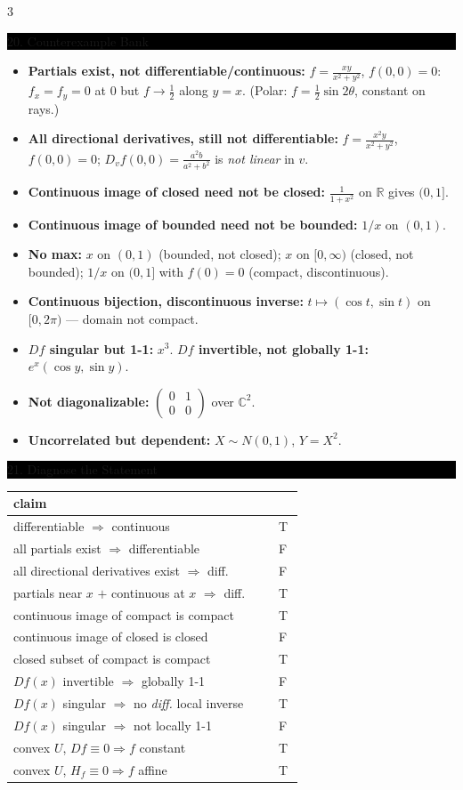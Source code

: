 \documentclass[8pt,letterpaper]{article}
\makeatletter
\newcommand{\sect}[1]{%
  \vspace{2.2pt}%
  \noindent\colorbox{black}{\parbox{\dimexpr\linewidth-2\fboxsep}{%
    \color{white}\bfseries\scshape\fontsize{6.4}{7.4}\selectfont
    \hyphenpenalty=10000\exhyphenpenalty=10000\raggedright #1}}%
  \vspace{1.4pt}\par\nopagebreak\@afterheading}
\newenvironment{tl}
  {\begin{itemize}[leftmargin=6pt,itemsep=0.3pt,topsep=1pt,parsep=0pt,
                   partopsep=0pt,label=\textcolor{gray}{\tiny$\bullet$}]}
  {\end{itemize}}
\newcommand{\R}{\mathbb{R}}
\newcommand{\Dd}{D}
\makeatother
\begin{document}
\begin{multicols}{3}
\sect{20. Counterexample Bank}
\begin{tl}
\item \textbf{Partials exist, not differentiable/continuous:} $f=\frac{xy}{x^2+y^2}$, $f(0,0)=0$: $f_x=f_y=0$ at $0$ but $f\to\frac12$ along $y=x$. (Polar: $f=\frac12\sin2\theta$, constant on rays.)
\item \textbf{All directional derivatives, still not differentiable:} $f=\frac{x^2y}{x^2+y^2}$, $f(0,0)=0$; $D_vf(0,0)=\frac{a^2b}{a^2+b^2}$ is \emph{not linear} in $v$.
\item \textbf{Continuous image of closed need not be closed:} $\frac{1}{1+x^2}$ on $\R$ gives $(0,1]$.
\item \textbf{Continuous image of bounded need not be bounded:} $1/x$ on $(0,1)$.
\item \textbf{No max:} $x$ on $(0,1)$ (bounded, not closed); $x$ on $[0,\infty)$ (closed, not bounded); $1/x$ on $(0,1]$ with $f(0)=0$ (compact, discontinuous).
\item \textbf{Continuous bijection, discontinuous inverse:} $t\mapsto(\cos t,\sin t)$ on $[0,2\pi)$ --- domain not compact.
\item \textbf{$\Dd f$ singular but 1-1:} $x^3$. \textbf{$\Dd f$ invertible, not globally 1-1:} $e^x(\cos y,\sin y)$.
\item \textbf{Not diagonalizable:} $\left(\begin{smallmatrix}0&1\\0&0\end{smallmatrix}\right)$ over $\mathbb C^2$.
\item \textbf{Uncorrelated but dependent:} $X\sim N(0,1)$, $Y=X^2$.
\end{tl}

\sect{21. Diagnose the Statement}
\begin{center}\fontsize{5.9}{6.9}\selectfont
\begin{tabular}{@{}p{0.84\linewidth}@{}p{0.08\linewidth}@{}}
\hline
claim & \\ \hline
differentiable $\Rightarrow$ continuous & T\\
all partials exist $\Rightarrow$ differentiable & F\\
all directional derivatives exist $\Rightarrow$ diff. & F\\
partials near $x$ $+$ continuous at $x$ $\Rightarrow$ diff. & T\\
continuous image of compact is compact & T\\
continuous image of closed is closed & F\\
closed subset of compact is compact & T\\
$\Dd f(x)$ invertible $\Rightarrow$ globally 1-1 & F\\
$\Dd f(x)$ singular $\Rightarrow$ no \emph{diff.} local inverse & T\\
$\Dd f(x)$ singular $\Rightarrow$ not locally 1-1 & F\\
convex $U$, $\Dd f\equiv0\Rightarrow f$ constant & T\\
convex $U$, $H_f\equiv0\Rightarrow f$ affine & T\\ \hline
\end{tabular}
\end{center}


\end{multicols}
\end{document}
